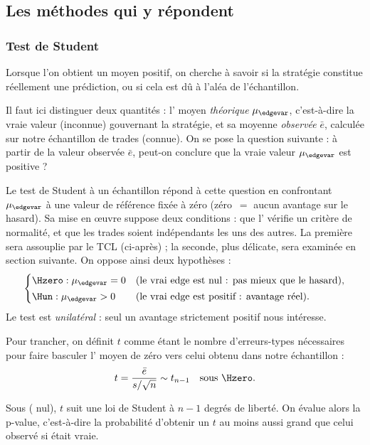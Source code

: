 \subsection{Les méthodes qui y répondent}

\subsubsection*{Test de Student}

Lorsque l'on obtient un \edgevar{} moyen positif, on cherche à savoir si la
stratégie constitue réellement une prédiction, ou si cela est dû à l'aléa
de l'échantillon.

Il faut ici distinguer deux quantités : l'\edgevar{} moyen
\emph{théorique} \(\mu_{\edgevar}\), c'est-à-dire la vraie valeur (inconnue)
gouvernant la stratégie, et sa moyenne
\emph{observée} \(\bar e\), calculée sur notre échantillon de trades
(connue). On se pose la question suivante : à partir de la valeur observée
\(\bar e\), peut-on conclure que la vraie valeur \(\mu_{\edgevar}\) est
positive ?

Le test de Student à un échantillon répond à cette question en confrontant
\(\mu_{\edgevar}\) à une valeur de référence fixée à zéro (zéro~$=$ aucun
avantage sur le hasard). Sa mise en \oe uvre suppose deux conditions : que l'\edgevar{}
vérifie un critère de normalité, et que les trades soient indépendants les uns des autres.
La première sera assouplie par le TCL (ci-après) ; 
la seconde, plus délicate, sera examinée en section suivante. On oppose ainsi deux
hypothèses :
\[
  \begin{cases}
    \Hzero : \mu_{\edgevar} = 0 & \text{(le vrai edge est nul : pas mieux que le hasard),}\\[2pt]
    \Hun : \mu_{\edgevar} > 0 & \text{(le vrai edge est positif : avantage réel).}
  \end{cases}
\]
Le test est \emph{unilatéral} : seul un avantage strictement positif nous
intéresse.

Pour trancher, on définit \(t\) comme étant le nombre d'erreurs-types
nécessaires pour faire basculer l'\edgevar{} moyen de zéro vers celui obtenu
dans notre échantillon :
\[
  t = \frac{\bar e}{s/\sqrt{n}} \sim t_{n-1} \quad\text{sous } \Hzero .
\]

Sous \Hzero{} (\edgevar{} nul), \(t\) suit une loi de Student à \(n-1\) degrés
de liberté. On évalue alors la p-value, c'est-à-dire la probabilité
d'obtenir un \(t\) au moins aussi grand que celui observé si \Hzero{}
était vraie.

